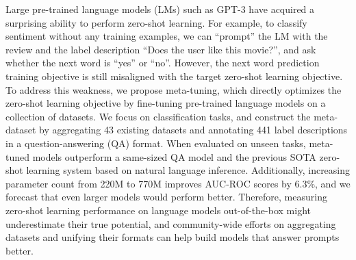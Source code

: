 Large pre-trained language models (LMs) such as GPT-3 have acquired a surprising ability to perform zero-shot learning. For example, to classify sentiment without any training examples, we can ``prompt'' the LM with the review and the label description ``Does the user like this movie?'', and ask whether the next word is ``yes'' or ``no''. However, the next word prediction training objective is still misaligned with the target zero-shot learning objective. To address this weakness, we propose meta-tuning, which directly optimizes the zero-shot learning objective by fine-tuning pre-trained language models on a collection of datasets. We focus on classification tasks, and construct the meta-dataset by aggregating 43 existing datasets and annotating 441 label descriptions in a question-answering (QA) format. When evaluated on unseen tasks, meta-tuned models outperform a same-sized QA model and the previous SOTA zero-shot learning system based on natural language inference. Additionally, increasing parameter count from 220M to 770M improves AUC-ROC scores by 6.3\%, and we forecast that even larger models would perform better. Therefore, measuring zero-shot learning performance on language models out-of-the-box might underestimate their true potential, and community-wide efforts on aggregating datasets and unifying their formats can help build models that answer prompts better.
